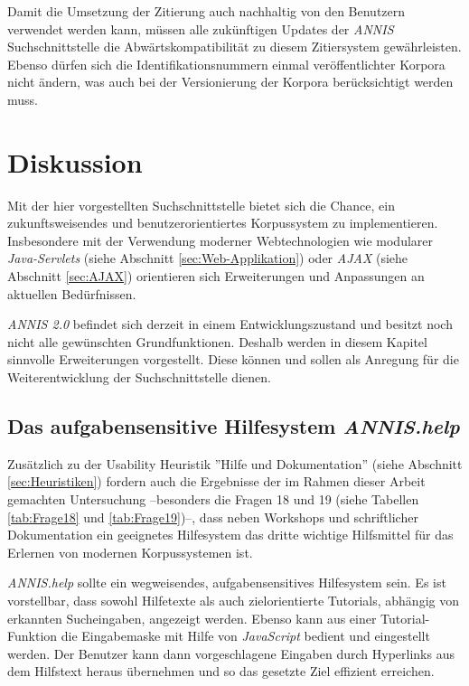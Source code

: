Damit die Umsetzung der Zitierung auch nachhaltig von den Benutzern verwendet werden kann, müssen alle zukünftigen Updates der \emph{ANNIS} Suchschnittstelle die Abwärtskompatibilität zu diesem Zitiersystem gewährleisten. Ebenso dürfen sich die Identifikationsnummern einmal veröffentlichter Korpora nicht ändern, was auch bei der Versionierung der Korpora berücksichtigt werden muss.

\newpage
\section{Diskussion}\label{sec:Diskussion}

Mit der hier vorgestellten Suchschnittstelle bietet sich die Chance, ein zukunftsweisendes und benutzerorientiertes Korpussystem zu implementieren. Insbesondere mit der Verwendung moderner Webtechnologien wie modularer \emph{Java-Servlets} (siehe Abschnitt \ref{sec:Web-Applikation}) oder \emph{AJAX} (siehe Abschnitt \ref{sec:AJAX}) orientieren sich Erweiterungen und Anpassungen an aktuellen Bedürfnissen.

\emph{ANNIS 2.0} befindet sich derzeit in einem Entwicklungszustand und besitzt noch nicht alle gewünschten Grundfunktionen. Deshalb werden in diesem Kapitel sinnvolle Erweiterungen vorgestellt. Diese können und sollen als Anregung für die Weiterentwicklung der Suchschnittstelle dienen.

\subsection{Das aufgabensensitive Hilfesystem \emph{ANNIS.help}}

Zusätzlich zu der Usability Heuristik ''Hilfe und Dokumentation'' (siehe Abschnitt \ref{sec:Heuristiken}) fordern auch die Ergebnisse der im Rahmen dieser Arbeit gemachten Untersuchung --besonders die Fragen 18 und 19 (siehe Tabellen \ref{tab:Frage18} und \ref{tab:Frage19})--, dass neben Workshops und schriftlicher Dokumentation ein geeignetes Hilfesystem das dritte wichtige Hilfsmittel für das Erlernen von modernen Korpussystemen ist. 

\emph{ANNIS.help} sollte ein wegweisendes, aufgabensensitives Hilfesystem sein. Es ist vorstellbar, dass sowohl Hilfetexte als auch zielorientierte Tutorials, abhängig von erkannten Sucheingaben, angezeigt werden. Ebenso kann aus einer Tutorial-Funktion die Eingabemaske mit Hilfe von \emph{JavaScript} bedient und eingestellt werden. Der Benutzer kann dann vorgeschlagene Eingaben durch Hyperlinks aus dem Hilfstext heraus übernehmen und so das gesetzte Ziel effizient erreichen. 

